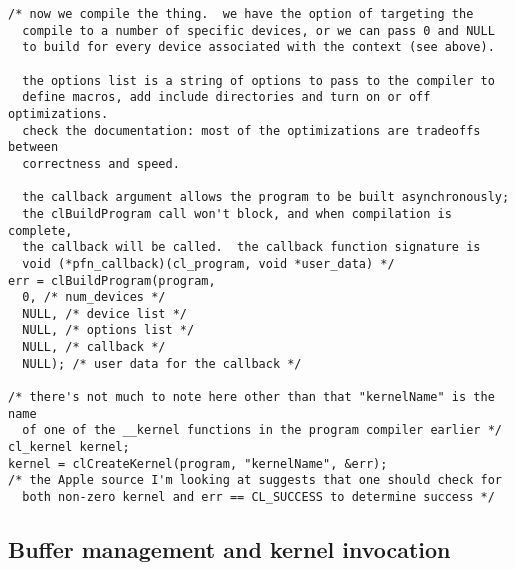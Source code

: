 \documentclass{article}
\begin{document}
\begin{verbatim}
/* now we compile the thing.  we have the option of targeting the
  compile to a number of specific devices, or we can pass 0 and NULL
  to build for every device associated with the context (see above). 
  
  the options list is a string of options to pass to the compiler to
  define macros, add include directories and turn on or off optimizations.
  check the documentation: most of the optimizations are tradeoffs between
  correctness and speed. 
  
  the callback argument allows the program to be built asynchronously; 
  the clBuildProgram call won't block, and when compilation is complete,
  the callback will be called.  the callback function signature is
  void (*pfn_callback)(cl_program, void *user_data) */  
err = clBuildProgram(program, 
  0, /* num_devices */
  NULL, /* device list */
  NULL, /* options list */
  NULL, /* callback */
  NULL); /* user data for the callback */

/* there's not much to note here other than that "kernelName" is the name
  of one of the __kernel functions in the program compiler earlier */
cl_kernel kernel;
kernel = clCreateKernel(program, "kernelName", &err);
/* the Apple source I'm looking at suggests that one should check for
  both non-zero kernel and err == CL_SUCCESS to determine success */
\end{verbatim}

\subsection{Buffer management and kernel invocation}
\end{document}
